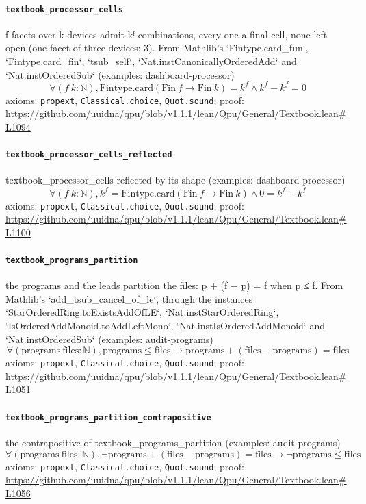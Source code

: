 \documentclass[11pt]{article}
\begin{document}
\paragraph{\texttt{textbook\_processor\_cells}}
f facets over k devices admit kᶠ combinations, every one a final cell, none left open (one facet of three devices: 3). From Mathlib's `Fintype.card\_fun`, `Fintype.card\_fin`, `tsub\_self`, `Nat.instCanonicallyOrderedAdd` and `Nat.instOrderedSub` (examples: dashboard-processor)
\[ \forall (f\ k : \mathbb{N}), \mathrm{Fintype.card} (\mathrm{Fin}\ f \to \mathrm{Fin}\ k) = k ^{f} \land k ^{f} - k ^{f} = 0 \]
\noindent axioms: \texttt{propext}, \texttt{Classical.choice}, \texttt{Quot.sound}; proof: \url{https://github.com/uuidna/qpu/blob/v1.1.1/lean/Qpu/General/Textbook.lean\#L1094}

\paragraph{\texttt{textbook\_processor\_cells\_reflected}}
textbook\_processor\_cells reflected by its shape (examples: dashboard-processor)
\[ \forall (f\ k : \mathbb{N}), k ^{f} = \mathrm{Fintype.card} (\mathrm{Fin}\ f \to \mathrm{Fin}\ k) \land 0 = k ^{f} - k ^{f} \]
\noindent axioms: \texttt{propext}, \texttt{Classical.choice}, \texttt{Quot.sound}; proof: \url{https://github.com/uuidna/qpu/blob/v1.1.1/lean/Qpu/General/Textbook.lean\#L1100}

\paragraph{\texttt{textbook\_programs\_partition}}
the programs and the leads partition the files: p + (f − p) = f when p ≤ f. From Mathlib's `add\_tsub\_cancel\_of\_le`, through the instances `StarOrderedRing.toExistsAddOfLE`, `Nat.instStarOrderedRing`, `IsOrderedAddMonoid.toAddLeftMono`, `Nat.instIsOrderedAddMonoid` and `Nat.instOrderedSub` (examples: audit-programs)
\[ \forall (\mathrm{programs}\ \mathrm{files} : \mathbb{N}), \mathrm{programs} \le \mathrm{files} \to \mathrm{programs} + (\mathrm{files} - \mathrm{programs}) = \mathrm{files} \]
\noindent axioms: \texttt{propext}, \texttt{Classical.choice}, \texttt{Quot.sound}; proof: \url{https://github.com/uuidna/qpu/blob/v1.1.1/lean/Qpu/General/Textbook.lean\#L1051}

\paragraph{\texttt{textbook\_programs\_partition\_contrapositive}}
the contrapositive of textbook\_programs\_partition (examples: audit-programs)
\[ \forall (\mathrm{programs}\ \mathrm{files} : \mathbb{N}), \neg \mathrm{programs} + (\mathrm{files} - \mathrm{programs}) = \mathrm{files} \to \neg \mathrm{programs} \le \mathrm{files} \]
\noindent axioms: \texttt{propext}, \texttt{Classical.choice}, \texttt{Quot.sound}; proof: \url{https://github.com/uuidna/qpu/blob/v1.1.1/lean/Qpu/General/Textbook.lean\#L1056}
\end{document}
